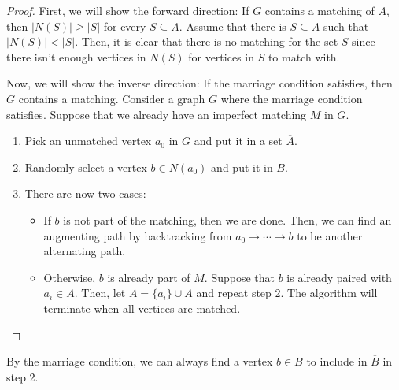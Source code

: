 \begin{proof}
  First, we will show the forward direction: If \(G\) contains a matching of
  \(A\), then \(|N(S)| \geq |S|\) for every \(S \subseteq A\). Assume that there
  is \(S \subseteq A\) such that \(|N(S)| < |S|\). Then, it is clear that there
  is no matching for the set \(S\) since there isn't enough vertices in \(N(S)\)
  for vertices in \(S\) to match with.

  Now, we will show the inverse direction: If the marriage condition satisfies,
  then \(G\) contains a matching. Consider a graph \(G\) where the marriage
  condition satisfies. Suppose that we already have an imperfect matching \(M\)
  in \(G\).
  \begin{enumerate}[label=\textit{Step \arabic*.}]
    \item Pick an unmatched vertex \(a_0\) in \(G\) and put
      it in a set \(\overline{A}\). 
    \item Randomly select a vertex \(b \in N(a_0)\) and put it in \(\overline{B}\).
    \item There are now two cases:
      \begin{itemize}
        \item If \(b\) is not part of the matching, then we are done. Then, we can
          find an augmenting path by backtracking from \(a_0 \to \cdots \to b\) to
          be another alternating path. 
        \item Otherwise, \(b\) is already part of \(M\). Suppose that \(b\) is
          already paired with \(a_i \in A\). Then, let \(\overline{A} = \{a_i\} \cup
          \overline{A}\) and repeat step 2. The algorithm will terminate when all
          vertices are matched.
      \end{itemize}
  \end{enumerate}
\end{proof}

\begin{remark}
  By the marriage condition, we can always find a vertex \(b \in B\) to include
  in \(\overline{B}\) in step 2.
\end{remark}

